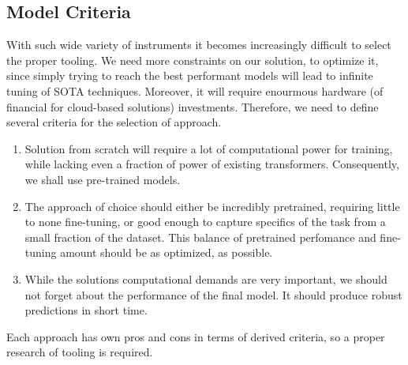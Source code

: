 \subsection{Model Criteria}

With such wide variety of instruments it becomes increasingly difficult to
select the proper tooling. We need more constraints on our solution, to
optimize it, since simply trying to reach the best performant models will lead
to infinite tuning of SOTA techniques. Moreover, it will require enourmous
hardware (of financial for cloud-based solutions) investments. Therefore, we
need to define several criteria for the selection of approach.

\begin{enumerate}
    \item Solution from scratch will require a lot of computational power for training,
          while lacking even a fraction of power of existing transformers. Consequently,
          we shall use pre-trained models.

    \item The approach of choice should either be incredibly pretrained, requiring little
          to none fine-tuning, or good enough to capture specifics of the task from a
          small fraction of the dataset. This balance of pretrained perfomance and
          fine-tuning amount should be as optimized, as possible.

    \item While the solutions computational demands are very important, we should not
          forget about the performance of the final model. It should produce robust
          predictions in short time.
\end{enumerate}

Each approach has own pros and cons in terms of derived criteria, so a proper
research of tooling is required.